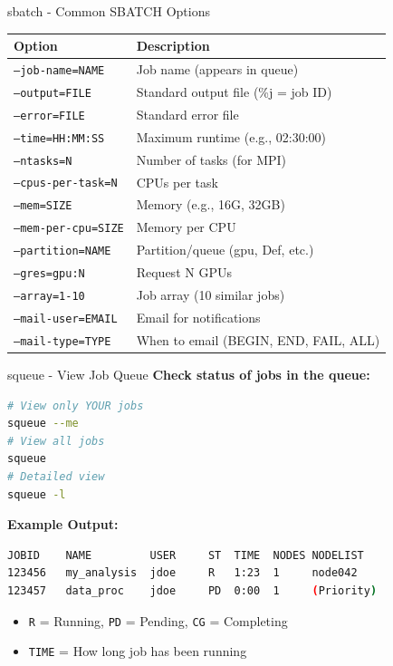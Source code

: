 \documentclass[aspectratio=169]{beamer}
\begin{document}
\begin{frame}[fragile]{sbatch - Common SBATCH Options}
\begin{table}
\small
\begin{tabular}{ll}
\toprule
\textbf{Option} & \textbf{Description} \\
\midrule
\texttt{--job-name=NAME} & Job name (appears in queue) \\
\texttt{--output=FILE} & Standard output file (\%j = job ID) \\
\texttt{--error=FILE} & Standard error file \\
\texttt{--time=HH:MM:SS} & Maximum runtime (e.g., 02:30:00) \\
\texttt{--ntasks=N} & Number of tasks (for MPI) \\
\texttt{--cpus-per-task=N} & CPUs per task \\
\texttt{--mem=SIZE} & Memory (e.g., 16G, 32GB) \\
\texttt{--mem-per-cpu=SIZE} & Memory per CPU \\
\texttt{--partition=NAME} & Partition/queue (gpu, Def, etc.) \\
\texttt{--gres=gpu:N} & Request N GPUs \\
\texttt{--array=1-10} & Job array (10 similar jobs) \\
\texttt{--mail-user=EMAIL} & Email for notifications \\
\texttt{--mail-type=TYPE} & When to email (BEGIN, END, FAIL, ALL) \\
\bottomrule
\end{tabular}
\end{table}
\end{frame}


\begin{frame}[fragile]{squeue - View Job Queue}
\textbf{Check status of jobs in the queue:}

\begin{lstlisting}[language=bash]
# View only YOUR jobs
squeue --me
# View all jobs
squeue
# Detailed view
squeue -l
\end{lstlisting}

\vspace{0.5em}
\textbf{Example Output:}
\begin{lstlisting}[language=bash]
JOBID    NAME         USER     ST  TIME  NODES NODELIST
123456   my_analysis  jdoe     R   1:23  1     node042
123457   data_proc    jdoe     PD  0:00  1     (Priority)
\end{lstlisting}

\begin{itemize}
    \item \texttt{R} = Running, \texttt{PD} = Pending, \texttt{CG} = Completing
    \item \texttt{TIME} = How long job has been running
\end{itemize}
\end{frame}
\end{document}
